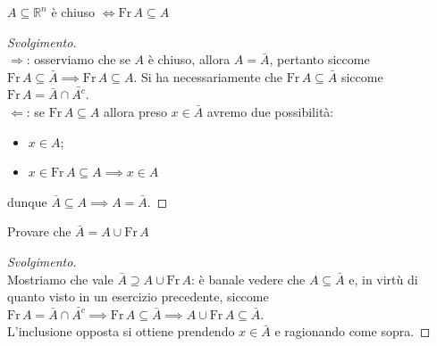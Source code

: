 %
\vspace{0.5cm}
\begin{exercise}
	$A \subseteq \mathbb{R}^n$ è chiuso $\iff \text{Fr} \, A \subseteq A$
\end{exercise}
%
\begin{proof}[Svolgimento] \hspace{1cm} \\
	$\boxed{\Rightarrow}$: osserviamo che se $A$ è chiuso, allora $A = \bar{A}$, pertanto siccome $\text{Fr} \, A \subseteq \bar{A} \implies \text{Fr} \, A \subseteq A$. Si ha necessariamente che $\text{Fr} \, A \subseteq \bar{A}$ siccome $\text{Fr} \, A = \bar{A} \cap \bar{A^c}$. \\
	$\boxed{\Leftarrow}$: se $\text{Fr} \, A \subseteq A$ allora preso $x \in \bar{A}$ avremo due possibilità:
	
	\begin{itemize}
		\item $x \in A$;
		\item $x \in \text{Fr} \, A \subseteq A \implies x \in A$
	\end{itemize}
	
	dunque $\bar{A} \subseteq A \implies A = \bar{A}$.
\end{proof}
%
\vspace{0.5cm}
\begin{exercise}
	Provare che $\bar{A} = A \cup \text{Fr} \, A$
\end{exercise}
%
\begin{proof}[Svolgimento] \hspace{1cm} \\
	Mostriamo che vale $\bar{A} \supseteq A \cup \text{Fr} \, A$: è banale vedere che $A \subseteq \bar{A}$ e, in virtù di quanto visto in un esercizio precedente, siccome $\text{Fr} \, A = \bar{A} \cap \bar{A^c} \implies \text{Fr} \, A \subseteq \bar{A} \implies A \cup \text{Fr} \, A \subseteq \bar{A}$. \\
	L'inclusione opposta si ottiene prendendo $x \in \bar{A}$ e ragionando come sopra.
\end{proof}
%
%
%
%
\vspace{0.5cm}
